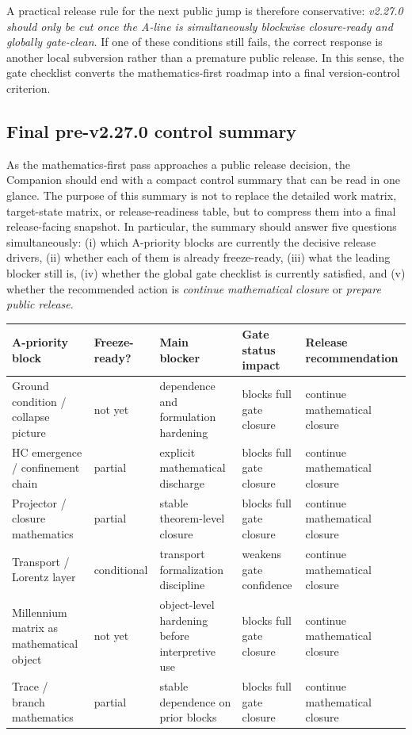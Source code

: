 A practical release rule for the next public jump is therefore conservative: \emph{v2.27.0 should only be cut once the A-line is simultaneously blockwise closure-ready and globally gate-clean}. If one of these conditions still fails, the correct response is another local subversion rather than a premature public release. In this sense, the gate checklist converts the mathematics-first roadmap into a final version-control criterion.

\subsection*{Final pre-v2.27.0 control summary}
As the mathematics-first pass approaches a public release decision, the Companion should end with a compact control summary that can be read in one glance. The purpose of this summary is not to replace the detailed work matrix, target-state matrix, or release-readiness table, but to compress them into a final release-facing snapshot. In particular, the summary should answer five questions simultaneously: (i) which A-priority blocks are currently the decisive release drivers, (ii) whether each of them is already freeze-ready, (iii) what the leading blocker still is, (iv) whether the global gate checklist is currently satisfied, and (v) whether the recommended action is \emph{continue mathematical closure} or \emph{prepare public release}.

\begin{center}
\small\begin{tabular}{p{} p{} p{} p{} p{}}
\toprule
\textbf{A-priority block} & \textbf{Freeze-ready?} & \textbf{Main blocker} & \textbf{Gate status impact} & \textbf{Release recommendation}\\
\midrule
Ground condition / collapse picture & not yet & dependence and formulation hardening & blocks full gate closure & continue mathematical closure\\
HC emergence / confinement chain & partial & explicit mathematical discharge & blocks full gate closure & continue mathematical closure\\
Projector / closure mathematics & partial & stable theorem-level closure & blocks full gate closure & continue mathematical closure\\
Transport / Lorentz layer & conditional & transport formalization discipline & weakens gate confidence & continue mathematical closure\\
Millennium matrix as mathematical object & not yet & object-level hardening before interpretive use & blocks full gate closure & continue mathematical closure\\
Trace / branch mathematics & partial & stable dependence on prior blocks & blocks full gate closure & continue mathematical closure\\
\bottomrule
\end{tabular}
\end{center}

